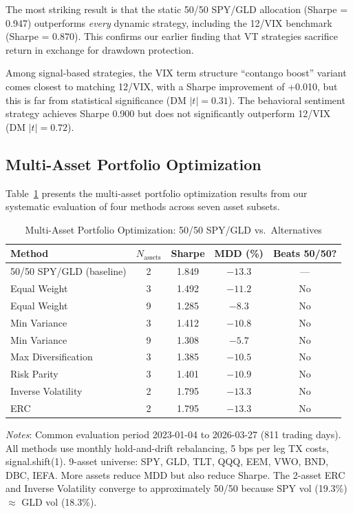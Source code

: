 \documentclass[12pt,a4paper]{article}
\begin{document}
The most striking result is that the static 50/50 SPY/GLD allocation (Sharpe = 0.947) outperforms \emph{every} dynamic strategy, including the 12/VIX benchmark (Sharpe = 0.870). This confirms our earlier finding that VT strategies sacrifice return in exchange for drawdown protection.

Among signal-based strategies, the VIX term structure ``contango boost'' variant comes closest to matching 12/VIX, with a Sharpe improvement of +0.010, but this is far from statistical significance (DM $|t| = 0.31$). The behavioral sentiment strategy achieves Sharpe 0.900 but does not significantly outperform 12/VIX (DM $|t| = 0.72$).

\subsection{Multi-Asset Portfolio Optimization}

Table~\ref{tab:multiasset} presents the multi-asset portfolio optimization results from our systematic evaluation of four methods across seven asset subsets.

\begin{table}[H]
\centering
\small
\begin{threeparttable}
\caption{Multi-Asset Portfolio Optimization: 50/50 SPY/GLD vs.\ Alternatives}
\label{tab:multiasset}
\begin{tabular}{@{}lcccc@{}}
\toprule
Method & $N_{\text{assets}}$ & Sharpe & MDD (\%) & Beats 50/50? \\
\midrule
50/50 SPY/GLD (baseline) & 2 & 1.849 & $-13.3$ & --- \\
\midrule
Equal Weight & 3 & 1.492 & $-11.2$ & No \\
Equal Weight & 9 & 1.285 & $-8.3$ & No \\
Min Variance & 3 & 1.412 & $-10.8$ & No \\
Min Variance & 9 & 1.308 & $-5.7$ & No \\
Max Diversification & 3 & 1.385 & $-10.5$ & No \\
Risk Parity & 3 & 1.401 & $-10.9$ & No \\
Inverse Volatility & 2 & 1.795 & $-13.3$ & No \\
ERC & 2 & 1.795 & $-13.3$ & No \\
\bottomrule
\end{tabular}
\begin{tablenotes}
\small
\item \textit{Notes}: Common evaluation period 2023-01-04 to 2026-03-27 (811 trading days). All methods use monthly hold-and-drift rebalancing, 5 bps per leg TX costs, signal.shift(1). 9-asset universe: SPY, GLD, TLT, QQQ, EEM, VWO, BND, DBC, IEFA. More assets reduce MDD but also reduce Sharpe. The 2-asset ERC and Inverse Volatility converge to approximately 50/50 because SPY vol (19.3\%) $\approx$ GLD vol (18.3\%).
\end{tablenotes}
\end{threeparttable}
\end{table}
\end{document}
